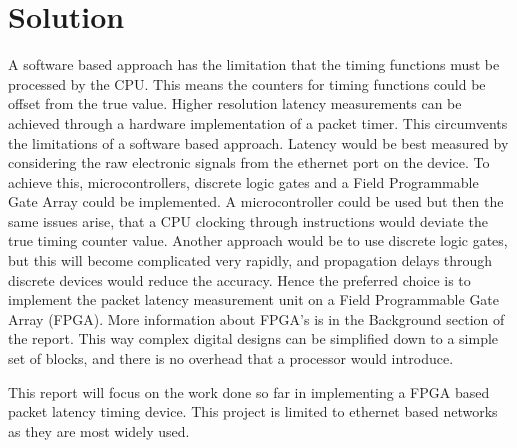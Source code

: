 \section{Solution}

\par A software based approach has the limitation that the timing functions must be processed by the
CPU. This means the counters for timing functions could be offset from the true value. Higher
resolution latency measurements can be achieved through a hardware implementation of a packet
timer. This circumvents the limitations of a software based approach.
Latency would be best measured by considering the raw electronic signals from the ethernet port on
the device. To achieve this, microcontrollers, discrete logic gates and a Field Programmable Gate
Array could be implemented. A microcontroller could be used but then the same issues arise, that a
CPU clocking through instructions would deviate the true timing counter value. Another approach
would be to use discrete logic gates, but this will become complicated very rapidly, and propagation
delays through discrete devices would reduce the accuracy. Hence the preferred choice is to
implement the packet latency measurement unit on a Field Programmable Gate Array (FPGA). More
information about FPGA’s is in the Background section of the report. This way complex digital
designs can be simplified down to a simple set of blocks, and there is no overhead that a processor
would introduce.

\par This report will focus on the work done so far in implementing a FPGA based packet latency timing
device. This project is limited to ethernet based networks as they are most widely used.
